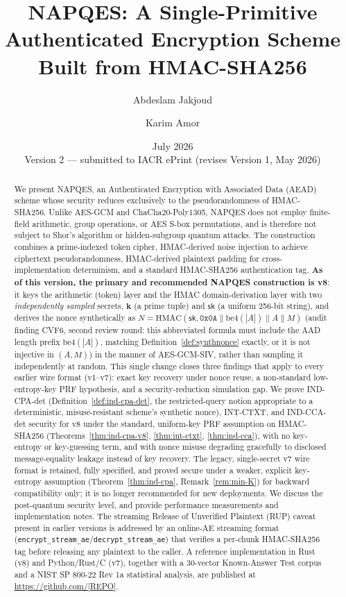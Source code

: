 \documentclass[11pt,a4paper]{article}
\title{\textbf{NAPQES: A Single-Primitive Authenticated Encryption Scheme\\
Built from HMAC-SHA256}}
\author[1]{Abdeslam Jakjoud}
\author[1]{Karim Amor}
\affil[1]{QAegis, France}
\date{July 2026 \\ \small{Version 2 --- submitted to IACR ePrint (revises Version 1, May 2026)}}
\begin{document}
\maketitle

\begin{abstract}
We present NAPQES, an Authenticated Encryption with Associated Data (AEAD)
scheme whose security reduces exclusively to the pseudorandomness of
HMAC-SHA256.  Unlike AES-GCM and ChaCha20-Poly1305, NAPQES does not employ
finite-field arithmetic, group operations, or AES S-box permutations, and is
therefore not subject to Shor's algorithm or hidden-subgroup quantum attacks.
The construction combines a prime-indexed token cipher, HMAC-derived noise
injection to achieve ciphertext pseudorandomness, HMAC-derived plaintext
padding for cross-implementation determinism, and a standard HMAC-SHA256
authentication tag.
\textbf{As of this version, the primary and recommended NAPQES construction
is v8}: it keys the arithmetic (token) layer and the HMAC domain-derivation
layer with two \emph{independently sampled} secrets, $\mathbf{k}$ (a prime
tuple) and $\mathsf{sk}$ (a uniform 256-bit string), and derives the nonce
synthetically as $N=\mathrm{HMAC}(\mathsf{sk}, \texttt{0x0A}\|\mathrm{be4}(|A|)\|A\|M)$
(audit finding CVF6, second review round: this abbreviated formula must
include the AAD length prefix $\mathrm{be4}(|A|)$, matching
Definition~\ref{def:synthnonce} exactly, or it is not injective in
$(A,M)$) in the manner of AES-GCM-SIV, rather than sampling it independently at random. This
single change closes three findings that apply to every earlier wire format
(v1--v7): exact key recovery under nonce reuse, a non-standard
low-entropy-key PRF hypothesis, and a security-reduction simulation gap.
We prove IND-CPA-det (Definition~\ref{def:ind-cpa-det}, the
restricted-query notion appropriate to a deterministic, misuse-resistant
scheme's synthetic nonce), INT-CTXT, and IND-CCA-det security for v8
under the standard, uniform-key PRF assumption on HMAC-SHA256
(Theorems~\ref{thm:ind-cpa-v8}, \ref{thm:int-ctxt}, \ref{thm:ind-cca}), with
no key-entropy or key-guessing term, and with nonce misuse degrading
gracefully to disclosed message-equality leakage instead of key recovery. The legacy, single-secret
v7 wire format is retained, fully specified, and proved secure under a
weaker, explicit key-entropy assumption
(Theorem~\ref{thm:ind-cpa}, Remark~\ref{rem:min-K}) for backward
compatibility only; it is no longer recommended for new deployments.
We discuss the post-quantum security level, and provide performance
measurements and implementation notes. The streaming Release of Unverified
Plaintext (RUP) caveat present in earlier versions is addressed by an
online-AE streaming format
(\texttt{encrypt\_stream\_ae}/\texttt{decrypt\_stream\_ae}) that verifies a
per-chunk HMAC-SHA256 tag before releasing any plaintext to the caller.
A reference implementation in Rust (v8) and Python/Rust/C (v7), together
with a 30-vector Known-Answer Test corpus and a NIST SP 800-22 Rev 1a
statistical analysis, are published at \url{https://github.com/[REPO]}.
\end{abstract}
\end{document}
